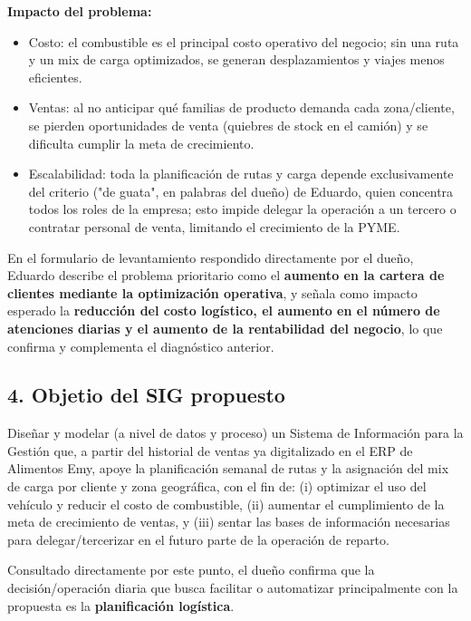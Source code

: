 \documentclass[10pt,a4paper]{article}
\begin{document}
\textbf{Impacto del problema:}
\begin{itemize}[leftmargin=1.2cm]
    \item Costo: el combustible es el principal costo operativo del negocio; sin una ruta y un mix de carga optimizados, se generan desplazamientos y viajes menos eficientes.
    \item Ventas: al no anticipar qué familias de producto demanda cada zona/cliente, se pierden oportunidades de venta (quiebres de stock en el camión) y se dificulta cumplir la meta de crecimiento. 
    \item Escalabilidad: toda la planificación de rutas y carga depende exclusivamente del criterio ("de guata", en palabras del dueño) de Eduardo, quien concentra todos los roles de la empresa; esto impide delegar la operación a un tercero o contratar personal de venta, limitando el crecimiento de la PYME.
    
\end{itemize}

\vspace{0.3cm}

En el formulario de levantamiento respondido directamente por el dueño, Eduardo describe el problema prioritario como el \textbf{aumento en la cartera de clientes mediante la optimización operativa}, y señala como impacto esperado la \textbf{reducción del costo logístico, el aumento en el número de atenciones diarias y el aumento de la rentabilidad del negocio}, lo que confirma y complementa el diagnóstico anterior.

\subsection*{4. Objetio del SIG propuesto}

Diseñar y modelar (a nivel de datos y proceso) un Sistema de Información para la Gestión que, a partir del historial de ventas ya digitalizado en el ERP de Alimentos Emy, apoye la planificación semanal de rutas y la asignación del mix de carga por cliente y zona geográfica, con el fin de: (i) optimizar el uso del vehículo y reducir el costo de combustible, (ii) aumentar el cumplimiento de la meta de crecimiento de ventas, y (iii) sentar las bases de información necesarias para delegar/tercerizar en el futuro parte de la operación de reparto.

Consultado directamente por este punto, el dueño confirma que la decisión/operación diaria que busca facilitar o automatizar principalmente con la propuesta es la \textbf{planificación logística}.
\end{document}
